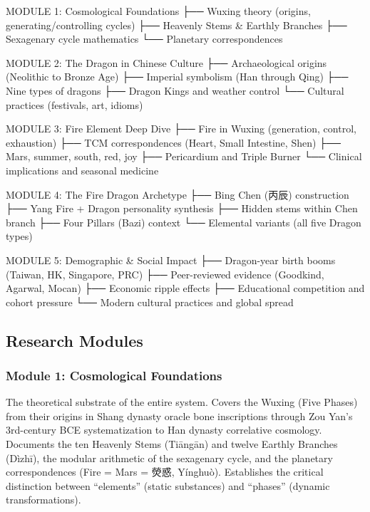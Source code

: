 \documentclass[11pt,letterpaper]{article}
\begin{document}
\begin{asciibox}
  MODULE 1: Cosmological Foundations
  ├── Wuxing theory (origins, generating/controlling cycles)
  ├── Heavenly Stems & Earthly Branches
  ├── Sexagenary cycle mathematics
  └── Planetary correspondences

  MODULE 2: The Dragon in Chinese Culture
  ├── Archaeological origins (Neolithic to Bronze Age)
  ├── Imperial symbolism (Han through Qing)
  ├── Nine types of dragons
  ├── Dragon Kings and weather control
  └── Cultural practices (festivals, art, idioms)

  MODULE 3: Fire Element Deep Dive
  ├── Fire in Wuxing (generation, control, exhaustion)
  ├── TCM correspondences (Heart, Small Intestine, Shen)
  ├── Mars, summer, south, red, joy
  ├── Pericardium and Triple Burner
  └── Clinical implications and seasonal medicine

  MODULE 4: The Fire Dragon Archetype
  ├── Bing Chen (丙辰) construction
  ├── Yang Fire + Dragon personality synthesis
  ├── Hidden stems within Chen branch
  ├── Four Pillars (Bazi) context
  └── Elemental variants (all five Dragon types)

  MODULE 5: Demographic & Social Impact
  ├── Dragon-year birth booms (Taiwan, HK, Singapore, PRC)
  ├── Peer-reviewed evidence (Goodkind, Agarwal, Mocan)
  ├── Economic ripple effects
  ├── Educational competition and cohort pressure
  └── Modern cultural practices and global spread
\end{asciibox}

\subsection{Research Modules}

\subsubsection{Module 1: Cosmological Foundations}
The theoretical substrate of the entire system. Covers the Wuxing (Five Phases) from their origins in Shang dynasty oracle bone inscriptions through Zou Yan's 3rd-century BCE systematization to Han dynasty correlative cosmology. Documents the ten Heavenly Stems (Tiāngān) and twelve Earthly Branches (Dìzhī), the modular arithmetic of the sexagenary cycle, and the planetary correspondences (Fire = Mars = 熒惑, Yínghuò). Establishes the critical distinction between ``elements'' (static substances) and ``phases'' (dynamic transformations).
\end{document}
